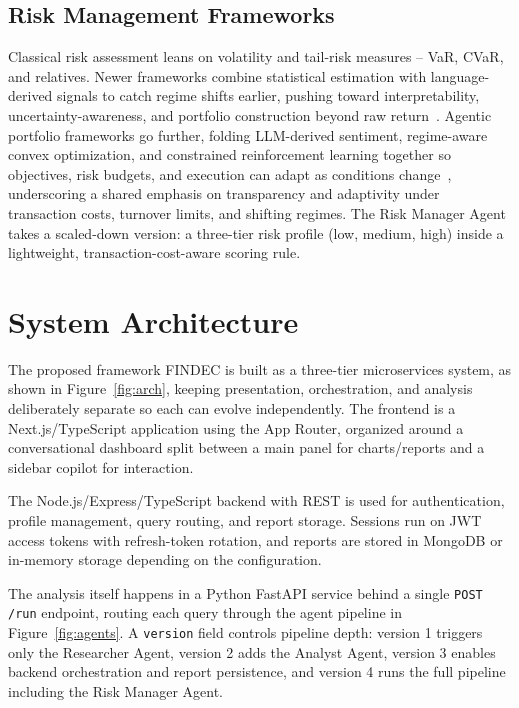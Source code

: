 \documentclass[conference]{IEEEtran}
\begin{document}
\subsection{Risk Management Frameworks}

Classical risk assessment leans on volatility and tail-risk measures -- VaR, CVaR, and relatives. Newer frameworks combine statistical estimation with language-derived signals to catch regime shifts earlier, pushing toward interpretability, uncertainty-awareness, and portfolio construction beyond raw return~\cite{chen2026smart}. Agentic portfolio frameworks go further, folding LLM-derived sentiment, regime-aware convex optimization, and constrained reinforcement learning together so objectives, risk budgets, and execution can adapt as conditions change~\cite{mantshimuli2026toward}, underscoring a shared emphasis on transparency and adaptivity under transaction costs, turnover limits, and shifting regimes. The Risk Manager Agent takes a scaled-down version: a three-tier risk profile (low, medium, high) inside a lightweight, transaction-cost-aware scoring rule.

\section{System Architecture}
\label{sec:arch}

The proposed framework FINDEC is built as a three-tier microservices system, as shown in Figure~\ref{fig:arch}, keeping presentation, orchestration, and analysis deliberately separate so each can evolve independently. The frontend is a Next.js/TypeScript application using the App Router, organized around a conversational dashboard split between a main panel for charts/reports and a sidebar copilot for interaction.

The Node.js/Express/TypeScript backend with REST is used for authentication, profile management, query routing, and report storage. Sessions run on JWT access tokens with refresh-token rotation, and reports are stored in MongoDB or in-memory storage depending on the configuration.

The analysis itself happens in a Python FastAPI service behind a single \texttt{POST /run} endpoint, routing each query through the agent pipeline in Figure~\ref{fig:agents}. A \texttt{version} field controls pipeline depth: version 1 triggers only the Researcher Agent, version 2 adds the Analyst Agent, version 3 enables backend orchestration and report persistence, and version 4 runs the full pipeline including the Risk Manager Agent.
\end{document}
